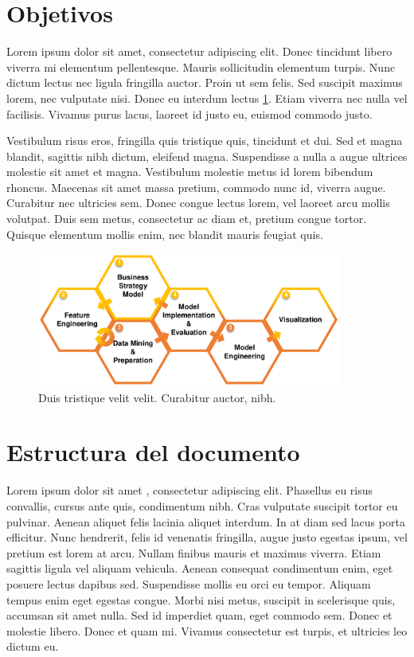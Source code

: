 \section{Objetivos}\label{sec:objetivos}
Lorem ipsum dolor sit amet, consectetur adipiscing elit. Donec tincidunt libero viverra mi elementum pellentesque. Mauris sollicitudin elementum turpis. Nunc dictum lectus nec ligula fringilla auctor. Proin ut sem felis. Sed suscipit maximus lorem, nec vulputate nisi. Donec eu interdum lectus \ref{fig:figure1}. Etiam viverra nec nulla vel facilisis. Vivamus purus lacus, laoreet id justo eu, euismod commodo justo.\par

Vestibulum risus eros, fringilla quis tristique quis, tincidunt et dui. Sed et magna blandit, sagittis nibh dictum, eleifend magna. Suspendisse a nulla a augue ultrices molestie sit amet et magna. Vestibulum molestie metus id lorem bibendum rhoncus. Maecenas sit amet massa pretium, commodo nunc id, viverra augue. Curabitur nec ultricies sem. Donec congue lectus lorem, vel laoreet arcu mollis volutpat. Duis sem metus, consectetur ac diam et, pretium congue tortor. Quisque elementum mollis enim, nec blandit mauris feugiat quis.\par

\begin{figure}[h]
    \centering
    \captionsetup{width=10cm}
    \includegraphics[width=10cm]{contenido/fig/DDSD.pdf}
    \caption{Duis tristique velit velit. Curabitur auctor, nibh.}
    \label{fig:figure1}
\end{figure}

\section{Estructura del documento}\label{sec:estructura}
Lorem ipsum dolor sit amet \cite{entry2013one}, consectetur adipiscing elit. Phasellus eu risus convallis, cursus ante quis, condimentum nibh. Cras vulputate suscipit tortor eu pulvinar. Aenean aliquet felis lacinia aliquet interdum. In at diam sed lacus porta efficitur. Nunc hendrerit, felis id venenatis fringilla, augue justo egestas ipsum, vel pretium est lorem at arcu. Nullam finibus mauris et maximus viverra. Etiam sagittis ligula vel aliquam vehicula. Aenean consequat condimentum enim, eget posuere lectus dapibus sed. Suspendisse mollis  eu orci eu tempor. Aliquam tempus enim eget egestas congue. Morbi nisi metus, suscipit in scelerisque quis, accumsan sit amet nulla. Sed id imperdiet quam, eget commodo sem. Donec et molestie libero. Donec et quam mi. Vivamus consectetur est turpis, et ultricies leo dictum eu.\par

